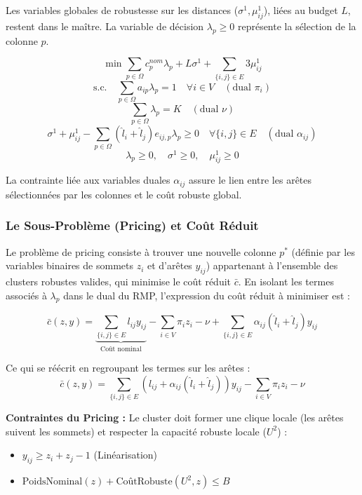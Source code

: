 \documentclass{article}
\begin{document}
Les variables globales de robustesse sur les distances ($\sigma^1, \mu_{ij}^1$), liées au budget $L$, restent dans le maître. La variable de décision $\lambda_p \ge 0$ représente la sélection de la colonne $p$.

$$ \min \sum_{p \in \Omega} c_p^{nom} \lambda_p + L \sigma^1 + \sum_{\{i,j\} \in E} 3 \mu_{ij}^1 $$
$$ \text{s.c.} \quad \sum_{p \in \Omega} a_{ip} \lambda_p = 1 \quad \forall i \in V \quad (\text{dual } \pi_i) $$
$$ \sum_{p \in \Omega} \lambda_p = K \quad (\text{dual } \nu) $$
$$ \sigma^1 + \mu_{ij}^1 - \sum_{p \in \Omega} (\hat{l}_i + \hat{l}_j) e_{ij,p} \lambda_p \ge 0 \quad \forall \{i,j\} \in E \quad (\text{dual } \alpha_{ij}) $$
$$ \lambda_p \ge 0, \quad \sigma^1 \ge 0, \quad \mu_{ij}^1 \ge 0 $$

La contrainte liée aux variables duales $\alpha_{ij}$ assure le lien entre les arêtes sélectionnées par les colonnes et le coût robuste global.

\subsubsection{Le Sous-Problème (Pricing) et Coût Réduit}

Le problème de pricing consiste à trouver une nouvelle colonne $p^*$ (définie par les variables binaires de sommets $z_i$ et d'arêtes $y_{ij}$) appartenant à l'ensemble des clusters robustes valides, qui minimise le coût réduit $\bar{c}$.
En isolant les termes associés à $\lambda_p$ dans le dual du RMP, l'expression du coût réduit à minimiser est :

$$ \bar{c}(z,y) = \underbrace{\sum_{\{i,j\} \in E} l_{ij} y_{ij}}_{\text{Coût nominal}} - \sum_{i \in V} \pi_i z_i - \nu + \sum_{\{i,j\} \in E} \alpha_{ij} (\hat{l}_i + \hat{l}_j) y_{ij} $$

Ce qui se réécrit en regroupant les termes sur les arêtes :
$$ \bar{c}(z,y) = \sum_{\{i,j\} \in E} \left( l_{ij} + \alpha_{ij}(\hat{l}_i + \hat{l}_j) \right) y_{ij} - \sum_{i \in V} \pi_i z_i - \nu $$

\textbf{Contraintes du Pricing :}
Le cluster doit former une clique locale (les arêtes suivent les sommets) et respecter la capacité robuste locale ($U^2$) :
\begin{itemize}
    \item $y_{ij} \ge z_i + z_j - 1$ (Linéarisation)
    \item $\text{PoidsNominal}(z) + \text{CoûtRobuste}(U^2, z) \le B$
\end{itemize}
\end{document}
